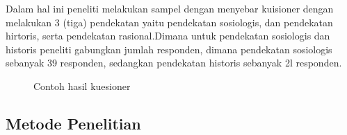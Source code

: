 \documentclass[letterpaper, 10 pt, conference]{ieeeconf}  %
\begin{document}
Dalam hal ini peneliti melakukan sampel dengan menyebar kuisioner dengan melakukan 3 (tiga) pendekatan yaitu pendekatan sosiologis, dan pendekatan hirtoris, serta pendekatan rasional.Dimana untuk pendekatan sosiologis dan historis peneliti gabungkan jumlah responden, dimana pendekatan sosiologis sebanyak 39 responden, sedangkan pendekatan historis sebanyak 2l responden.

\begin{figure}
\centering
{}
\caption{Contoh hasil kuesioner}
\label{fig:false-color}
\end{figure}

\subsection{Metode Penelitian}
\end{document}
